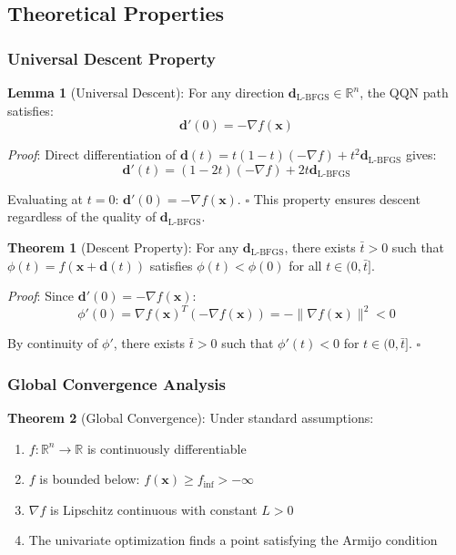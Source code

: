 \hypertarget{theoretical-properties}{%
\subsection{Theoretical Properties}\label{theoretical-properties}}

\hypertarget{universal-descent-property}{%
\subsubsection{Universal Descent Property}\label{universal-descent-property}}

\textbf{Lemma 1} (Universal Descent): For any direction \(\mathbf{d}_{\text{L-BFGS}} \in \mathbb{R}^n\), the QQN path satisfies:
\[\mathbf{d}'(0) = -\nabla f(\mathbf{x})\]

\emph{Proof}: Direct differentiation of \(\mathbf{d}(t) = t(1-t)(-\nabla f) + t^2 \mathbf{d}_{\text{L-BFGS}}\) gives:
\[\mathbf{d}'(t) = (1-2t)(-\nabla f) + 2t\mathbf{d}_{\text{L-BFGS}}\]

Evaluating at \(t=0\): \(\mathbf{d}'(0) = -\nabla f(\mathbf{x})\). \(\square\)
This property ensures descent regardless of the quality of \(\mathbf{d}_{\text{L-BFGS}}\).

\textbf{Theorem 1} (Descent Property): For any \(\mathbf{d}_{\text{L-BFGS}}\), there exists \(\bar{t} > 0\) such that \(\phi(t) = f(\mathbf{x} + \mathbf{d}(t))\) satisfies \(\phi(t) < \phi(0)\) for all \(t \in (0, \bar{t}]\).

\emph{Proof}: Since \(\mathbf{d}'(0) = -\nabla f(\mathbf{x})\):
\[\phi'(0) = \nabla f(\mathbf{x})^T(-\nabla f(\mathbf{x})) = -\|\nabla f(\mathbf{x})\|^2 < 0\]

By continuity of \(\phi'\), there exists \(\bar{t} > 0\) such that \(\phi'(t) < 0\) for \(t \in (0, \bar{t}]\). \(\square\)

\hypertarget{global-convergence-analysis}{%
\subsubsection{Global Convergence Analysis}\label{global-convergence-analysis}}

\textbf{Theorem 2} (Global Convergence): Under standard assumptions:

\begin{enumerate}
\def\labelenumi{\arabic{enumi}.}
\tightlist
\item
  \(f: \mathbb{R}^n \rightarrow \mathbb{R}\) is continuously differentiable
\item
  \(f\) is bounded below: \(f(\mathbf{x}) \geq f_{\text{inf}} > -\infty\)
\item
  \(\nabla f\) is Lipschitz continuous with constant \(L > 0\)
\item
  The univariate optimization finds a point satisfying the Armijo condition
\end{enumerate}

